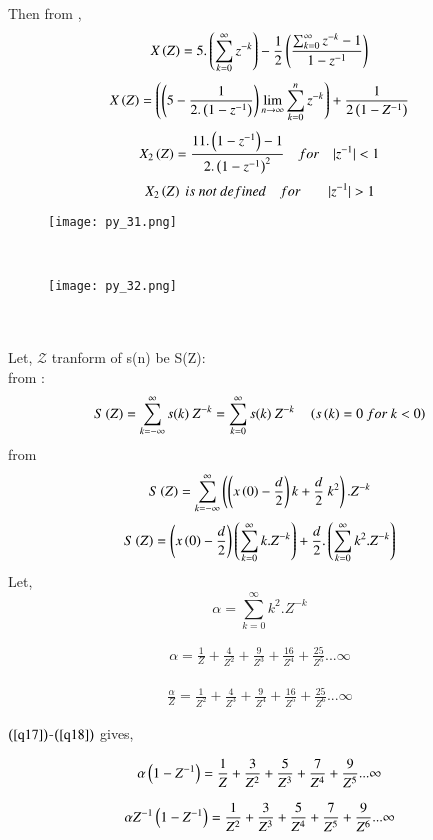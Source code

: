 \documentclass[beamer]{IEEEtran}
\theoremstyle{remark}
\begin{document}
Then from \brak{\ref{q16}},
$$X\left(Z\right)=5.\left(\sum_{k=0}^{\infty}z^{-k}\right)-\frac{1}{2}\left(\frac{\sum_{k=0}^{\infty}z^{-k}-1}{1-z^{-1}}\right)$$
$$X\left(Z\right)=\left(\left(5-\frac{1}{2.\left(1-z^{-1}\right)}\right)\lim_{n\to\infty}\sum_{k=0}^{n}z^{-k}\right)+\frac{1}{2\left(1-Z^{-1}\right)}$$
$$X_2\left(Z\right)=\frac{11.\left(1-z^{-1}\right)-1}{2.\left(1-z^{-1}\right)^2}\quad for\quad |z^{-1}|<1$$
$$X_2\brak{Z}\ is\ not\ defined\quad for\qquad |z^{-1}|>1$$
\begin{figure}[h]
    \centering
    \texttt{[image: py\_31.png]}
    \label{fig:enter-label}
\end{figure}\\
\begin{figure}[h]
    \centering
    \texttt{[image: py\_32.png]}
    \label{fig:enter-label}
\end{figure}\\\\

Let, $\mathcal{Z}$ tranform of s(n) be S(Z):\\
from \brak{\ref{q11}}:
$$S\brak{Z}=\sum_{k=-\infty}^{\infty}s(k)\ Z^{-k}=\sum_{k=0}^{\infty}s(k)\ Z^{-k}\quad \brak{s\brak{k}=0\ for\ k<0}$$
from \brak{\ref{q9}}
$$S\brak{Z}=\sum_{k=-\infty}^{\infty}\left(\brak{x\brak{0}-\frac{d}{2}}k+\frac{d}{2}\ k^2\right).Z^{-k}$$
\begin{align}
\label{q17}
    S\left(Z\right)=\left(x\left(0\right)-\frac{d}{2}\right)\left(\sum_{k=0}^{\infty}k.Z^{-k}\right)+\frac{d}{2}.\left(\sum_{k=0}^{\infty}k^2.Z^{-k}\right)
\end{align}
Let, 
$$
\alpha = \sum_{k=0}^{\infty}k^2.Z^{-k}
$$

\begin{align}
\label{q18}
    \alpha=\frac{1}{Z}+\frac{4}{Z^2}+\frac{9}{Z^3}+\frac{16}{Z^4}+\frac{25}{Z^5}...\infty
\end{align}

\begin{align}
\label{q19}
    \frac{\alpha}{Z}=\frac{1}{Z^2}+\frac{4}{Z^3}+\frac{9}{Z^4}+\frac{16}{Z^5}+\frac{25}{Z^6}...\infty
\end{align}

$\left(\ref{q17}\right)$-$\left(\ref{q18}\right)$ gives,

\begin{align}
\label{q20}
   \alpha\left(1-Z^{-1}\right)=\frac{1}{Z}+\frac{3}{Z^2}+\frac{5}{Z^3}+\frac{7}{Z^4}+\frac{9}{Z^5}...\infty 
\end{align}

\begin{align}
\label{q21}
   \alpha Z^{-1}\left(1-Z^{-1}\right)=\frac{1}{Z^2}+\frac{3}{Z^3}+\frac{5}{Z^4}+\frac{7}{Z^5}+\frac{9}{Z^6}...\infty 
\end{align}
\end{document}
